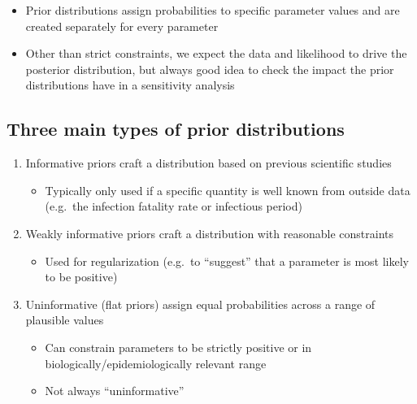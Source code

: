 \documentclass[
  letterpaper,
  DIV=11,
  numbers=noendperiod]{scrartcl}
\providecommand{\tightlist}{%
  \setlength{\itemsep}{0pt}\setlength{\parskip}{0pt}}\usepackage{longtable,booktabs,array}
\begin{document}
\Large

\begin{itemize}
\tightlist
\item
  Prior distributions assign probabilities to specific parameter values
  and are created separately for every parameter
\item
  Other than strict constraints, we expect the data and likelihood to
  drive the posterior distribution, but always good idea to check the
  impact the prior distributions have in a sensitivity analysis
\end{itemize}

\hypertarget{three-main-types-of-prior-distributions}{%
\subsection{Three main types of prior
distributions}\label{three-main-types-of-prior-distributions}}

\Large

\begin{enumerate}
\def\labelenumi{\arabic{enumi}.}
\tightlist
\item
  Informative priors craft a distribution based on previous scientific
  studies

  \begin{itemize}
  \tightlist
  \item
    Typically only used if a specific quantity is well known from
    outside data (e.g.~the infection fatality rate or infectious period)
  \end{itemize}
\item
  Weakly informative priors craft a distribution with reasonable
  constraints

  \begin{itemize}
  \tightlist
  \item
    Used for regularization (e.g.~to ``suggest'' that a parameter is
    most likely to be positive)
  \end{itemize}
\item
  Uninformative (flat priors) assign equal probabilities across a range
  of plausible values

  \begin{itemize}
  \tightlist
  \item
    Can constrain parameters to be strictly positive or in
    biologically/epidemiologically relevant range
  \item
    Not always ``uninformative''
  \end{itemize}
\end{enumerate}
\end{document}
